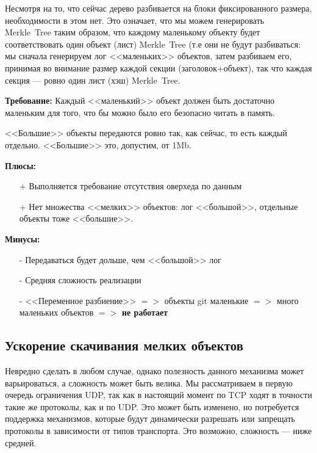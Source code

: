 \documentclass[11pt,a4paper]{article}
\begin{document}
Несмотря на то, что сейчас дерево разбивается на блоки фиксированного размера,
необходимости в этом нет. Это означает, что мы можем генерировать Merkle~Tree
таким образом, что каждому маленькому объекту будет соответствовать один объект
(лист) Merkle~Tree (т.е они не будут разбиваться: мы сначала генерируем лог
<<маленьких>> объектов, затем разбиваем его, принимая во внимание размер каждой
секции (заголовок+объект), так что каждая секция --- ровно один лист (хэш)
Merkle~Tree.

\textbf{Требование:} Каждый <<маленький>> объект должен быть достаточно
маленьким для того, что бы можно было его безопасно читать в память.

<<Большие>> объекты передаются ровно так, как сейчас, то есть каждый отдельно.
<<Большие>> это, допустим, от 1Mb.


\textbf{Плюсы:}

\begin{itemize}
  \item[+] Выполняется требование отсутствия оверхеда по данным
  \item[+] Нет множества <<мелких>> объектов: лог <<большой>>,
           отдельные объекты тоже <<большие>>.
\end{itemize}

\textbf{Минусы:}

\begin{itemize}
  \item[-] Передаваться будет дольше, чем <<большой>> лог
  \item[-] Средняя сложность реализации
  \item[-] <<Переменное разбиение>> $ => $ объекты git маленькие $ => $ много
           маленьких объектов $ => $ \textbf{не работает}
\end{itemize}

\subsection{Ускорение скачивания мелких объектов}

Невредно сделать в любом случае, однако полезность данного механизма может
варьироваться, а сложность может быть велика. Мы рассматриваем в первую очередь
ограничения UDP, так как в настоящий момент по TCP ходят в точности такие же
протоколы, как и по UDP. Это может быть изменено, но потребуется поддержка
механизмов, которые будут динамически разрешать или запрещать протоколы в
зависимости от типов транспорта. Это возможно, сложность --- ниже средней.
\end{document}
